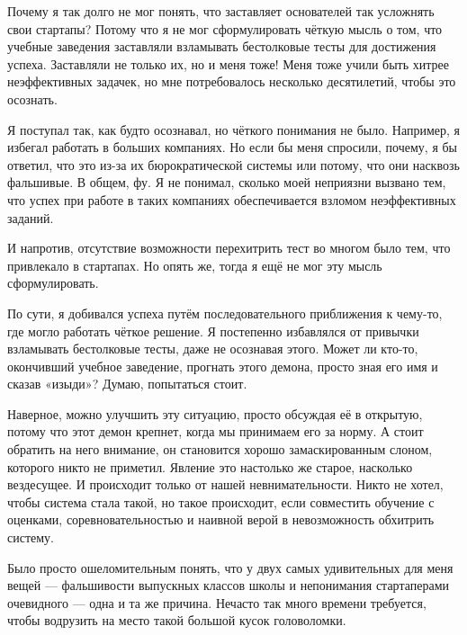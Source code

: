\documentclass[ebook,12pt,oneside,openany]{memoir}
\begin{document}
Почему я так долго не мог понять, что заставляет основателей так
усложнять свои стартапы? Потому что я не мог сформулировать чёткую
мысль о том, что учебные заведения заставляли взламывать бестолковые
тесты для достижения успеха. Заставляли не только их, но и меня тоже!
Меня тоже учили быть хитрее неэффективных задачек, но мне
потребовалось несколько десятилетий, чтобы это осознать. \newline

Я поступал так, как будто осознавал, но чёткого понимания не было.
Например, я избегал работать в больших компаниях. Но если бы меня
спросили, почему, я бы ответил, что это из-за их бюрократической
системы или потому, что они насквозь фальшивые. В общем, фу. Я не
понимал, сколько моей неприязни вызвано тем, что успех при работе в
таких компаниях обеспечивается взломом неэффективных заданий. \newline

И напротив, отсутствие возможности перехитрить тест во многом было
тем, что привлекало в стартапах. Но опять же, тогда я ещё не мог эту
мысль сформулировать. \newline

По сути, я добивался успеха путём последовательного приближения к
чему-то, где могло работать чёткое решение. Я постепенно избавлялся от
привычки взламывать бестолковые тесты, даже не осознавая этого. Может
ли кто-то, окончивший учебное заведение, прогнать этого демона, просто
зная его имя и сказав «изыди»? Думаю, попытаться стоит. \newline

Наверное, можно улучшить эту ситуацию, просто обсуждая её в открытую,
потому что этот демон крепнет, когда мы принимаем его за норму. А
стоит обратить на него внимание, он становится хорошо замаскированным
слоном, которого никто не приметил. Явление это настолько же старое,
насколько вездесущее. И происходит только от нашей невнимательности.
Никто не хотел, чтобы система стала такой, но такое происходит, если
совместить обучение с оценками, соревновательностью и наивной верой в
невозможность обхитрить систему. \newline

Было просто ошеломительным понять, что у двух самых удивительных для
меня вещей — фальшивости выпускных классов школы и непонимания
стартаперами очевидного — одна и та же причина. Нечасто так много
времени требуется, чтобы водрузить на место такой большой кусок
головоломки. \newline
\end{document}
